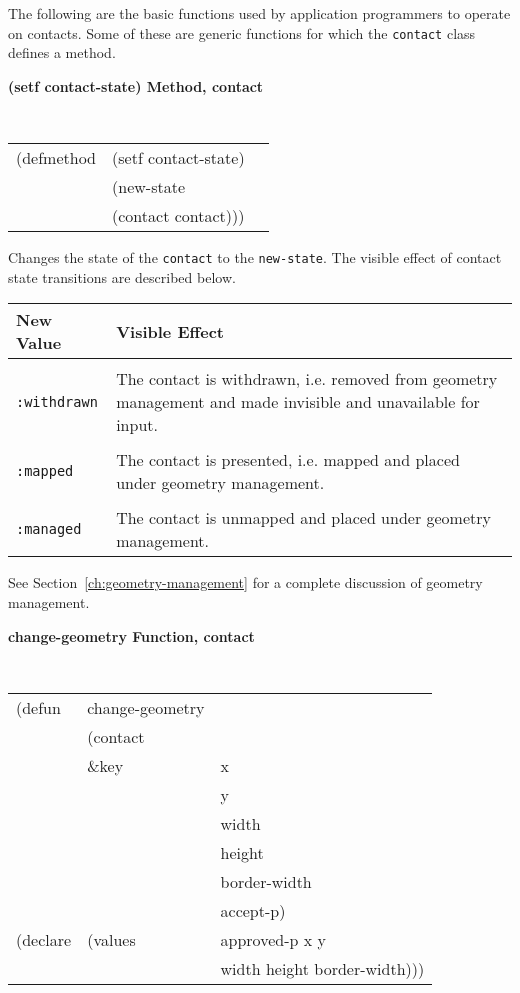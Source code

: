 The following are the basic functions  used by
application programmers to operate on contacts. Some of these are generic
functions for which the {\tt contact} class defines a method.

{\samepage
{\large {\bf (setf contact-state) \hfill Method, contact}}
\begin{flushright}
\parbox[t]{6.125in}{
\tt
\begin{tabular}{lll}
\raggedright
(defmethod & (setf contact-state) & \\
& (new-state \\
&  (contact  contact)))
\end{tabular}
\rm
}\end{flushright}}

\begin{flushright}
\parbox[t]{6.125in}{
Changes the state of the {\tt contact} to the {\tt new-state}. The visible effect
of contact state transitions are described below.

\begin{center}
\begin{tabular}{lp{4.25in}}
New Value & Visible Effect \\ \hline \\
{\tt :withdrawn} & The contact is withdrawn, i.e. removed from geometry management and
made invisible and unavailable for input.\\ 
\\
{\tt :mapped} & The contact is presented, i.e. mapped and placed under geometry
management.\\ \\
{\tt :managed} &  The contact is unmapped and placed under geometry management. 
\end{tabular}
\end{center}

See Section~\ref{ch:geometry-management} for a complete discussion of 
geometry management.

}\end{flushright}


{\samepage
{\large {\bf change-geometry \hfill Function, contact}}
\begin{flushright}
\parbox[t]{6.125in}{
\tt
\begin{tabular}{lll}
\raggedright
(defun & change-geometry & \\
& (contact\\
& \&key & x  \\
& & y   \\
& & width \\
& & height   \\
& &border-width\\
& &accept-p) \\
(declare &(values &approved-p x y \\
&& width height border-width)))
\end{tabular}
\rm}
\end{flushright}
}

